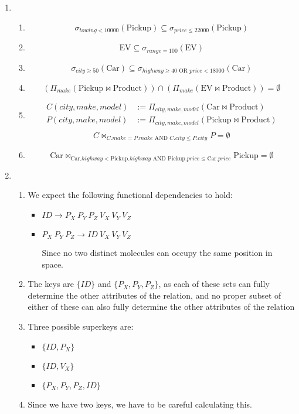 \documentclass[12pt,letterpaper]{article}
\newcommand{\parens}[1]{\left(#1\right)}
\newcommand{\Car}[0]{\text{Car}}
\newcommand{\EV}[0]{\text{EV}}
\newcommand{\Pickup}[0]{\text{Pickup}}
\newcommand{\Product}[0]{\text{Product}}
\newcommand{\AND}[0]{\text{ AND }}
\newcommand{\OR}[0]{\text{ OR }}
\begin{document}
\begin{enumerate}
    \item
      \begin{enumerate}
        \item
          \[
            \sigma_{towing < 10000}\parens{\Pickup} \subseteq \sigma_{price \le 22000}\parens{\Pickup}
          \]
        \item
          \[
            \EV \subseteq \sigma_{range = 100}\parens{\EV}
          \]
        \item
          \[
            \sigma_{city \ge 50}\parens{\Car} \subseteq \sigma_{highway \ge 40 \OR price < 18000}\parens{\Car}
          \]
        \item
          \[
            \parens{\Pi_{make}\parens{\Pickup \bowtie \Product}} \cap \parens{\Pi_{make}\parens{\EV \bowtie \Product}} = \emptyset
          \]
        \item
          \begin{align*}
            C(city, make, model) &:= \Pi_{city, make, model}\parens{\Car \bowtie \Product} \\
            P(city, make, model) &:= \Pi_{city, make, model}\parens{\Pickup \bowtie \Product} \\
          \end{align*}
          \[
            C \bowtie_{C.make = P.make \AND C.city \le P.city} P = \emptyset
          \]
        \item
          \[
            \Car \bowtie_{\Car.highway < \Pickup.highway \AND \Pickup.price \le \Car.price} \Pickup = \emptyset
          \]
      \end{enumerate}

    \item
      \begin{enumerate}
        \item We expect the following functional dependencies to hold:
          \begin{itemize}
            \item $ID \rightarrow P_X \ P_Y \ P_Z \ V_X \ V_Y \ V_Z$
            \item $P_X \ P_Y \ P_Z \rightarrow ID \ V_X \ V_Y \ V_Z$

              Since no two distinct molecules can occupy the same position in space.
          \end{itemize}
        \item The keys are $\{ID\}$ and $\{P_X, P_Y, P_Z\}$,
          as each of these sets can fully determine the other attributes of the relation,
          and no proper subset of either of these can also fully determine the other attributes of the relation
        \item Three possible superkeys are:
          \begin{itemize}
            \item $\{ID, P_X\}$
            \item $\{ID, V_X\}$
            \item $\{P_X, P_Y, P_Z, ID\}$
          \end{itemize}
        \item
          Since we have two keys, we have to be careful calculating this.


\end{enumerate}
\end{enumerate}
\end{document}
